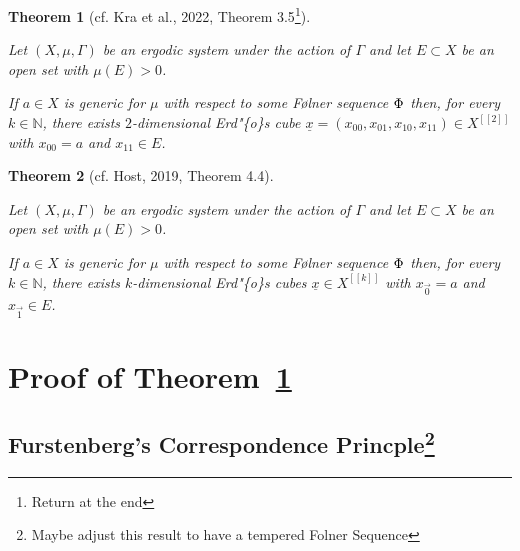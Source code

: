 \documentclass[
  british,
]{article}
\theoremstyle{definition}
\theoremstyle{plain}
\theoremstyle{plain}
\newtheorem{theorem}{Theorem}[section]
\theoremstyle{plain}
\theoremstyle{remark}
\newcommand{\AmenableGroup}{{\Gamma}}
\newcommand{\FCPElement}{{a}}
\newcommand{\Folner}[1][\vphantom{}]{{\Phi}_{#1}}
\newcommand{\Measure}{{\mu}}
\newcommand{\N}{\mathbb{N}}
\newcommand{\ShiftSpace}{{X}}
\begin{document}
\begin{theorem}[{cf. Kra et al., 2022, Theorem
3.5}\footnote{Return at the end}]\protect\hypertarget{thm-GenErdosConjCube}{}\label{thm-GenErdosConjCube}

Let \((\ShiftSpace,\Measure,\AmenableGroup)\) be an ergodic system under
the action of \(\AmenableGroup\) and let \(E\subset X\) be an open set
with \(\Measure(E)>0\).

If \(\FCPElement\in X\) is generic for \(\Measure\) with respect to some
Følner sequence \(\Folner\) then, for every \(k\in\N\), there exists
\(2\)-dimensional Erd"\{o\}s cube
\(\underline{x}=(x_{00},x_{01},x_{10},x_{11})\in X^{[[2]]}\) with
\(x_{00}=a\) and \(x_{11}\in E\).

\end{theorem}

\begin{theorem}[{cf. Host, 2019, Theorem
4.4}]\protect\hypertarget{thm-GenNErdosConjCube}{}\label{thm-GenNErdosConjCube}

Let \((X,\Measure,\AmenableGroup)\) be an ergodic system under the
action of \(\AmenableGroup\) and let \(E\subset X\) be an open set with
\(\Measure(E)>0\).

If \(\FCPElement\in X\) is generic for \(\Measure\) with respect to some
Følner sequence \(\Folner\) then, for every \(k\in\N\), there exists
\(k\)-dimensional Erd"\{o\}s cubes \(\underline{x}\in X^{[[k]]}\) with
\(x_{\vec{0}}=a\) and \(x_{\vec{1}}\in E\).

\end{theorem}

\section{\texorpdfstring{Proof of
Theorem~\ref{thm-GenErdosConjCube}}{Proof of Theorem~}}\label{proof-of-thm-generdosconjcube}

\subsection[Furstenberg's Correspondence
Princple]{\texorpdfstring{Furstenberg's Correspondence
Princple\footnote{Maybe adjust this result to have a tempered Folner
  Sequence}}{Furstenberg's Correspondence Princple}}\label{furstenbergs-correspondence-princple}
\end{document}
